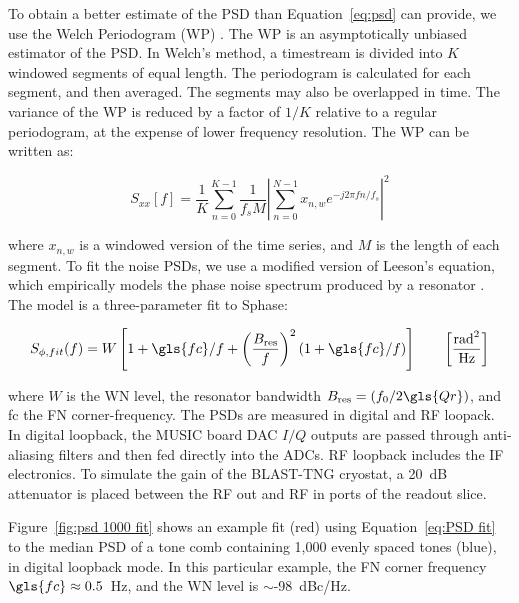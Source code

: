 To obtain a better estimate of the PSD than Equation~\ref{eq:psd} can provide, we use the Welch Periodogram (WP) \citep{welch1967use}. The WP is an asymptotically unbiased estimator of the PSD\@. In Welch's method, a timestream is divided into $K$ windowed segments of equal length. The periodogram is calculated for each segment, and then averaged. The segments may also be overlapped in time. The variance of the WP is reduced by a factor of $1/K$ relative to a regular periodogram, at the expense of lower frequency resolution. The WP can be written as:

\begin{equation}\label{eq:WP}
S_{xx}[f] = \frac{1}{K} \sum_{n=0}^{K - 1}\frac{1}{f_{s} M} \left| \sum_{n=0}^{N - 1} x_{n,w} e^{-j2\pi f n / f_{s} }\right|^{2}
\end{equation}

where $x_{n,w}$ is a windowed version of the time series, and $M$ is the length of each segment. To fit the noise PSDs, we use a modified version of Leeson's equation, which empirically models the phase noise spectrum produced by a resonator \citep{lesson1966simple}. The model is a three-parameter fit to \gls{Sphase}:

\begin{equation}\label{eq:PSD fit}
  S_{\phi,fit}(f) = W\left[ 1 + \gls{fc}/f + \left( \frac{B_{\mathrm{res}}}{f} \right)^{2} (1 + \gls{fc}/f) \right] \qquad \left[  \frac{\mathrm{rad}^{2}}{\mathrm{Hz}} \right]
\end{equation}

where $W$ is the WN level, the resonator bandwidth $B_{\mathrm{res}} = (f_{0}/2\gls{Qr})$, and \gls{fc} the FN corner-frequency. The PSDs are measured in digital and RF loopack. In digital loopback, the MUSIC board DAC $I/Q$ outputs are passed through anti-aliasing filters and then fed directly into the ADCs. RF loopback includes the IF electronics. To simulate the gain of the BLAST-TNG cryostat, a 20~dB attenuator is placed between the RF out and RF in ports of the readout slice.

Figure~\ref{fig:psd 1000 fit} shows an example fit (red) using Equation~\ref{eq:PSD fit} to the median PSD of a tone comb containing 1,000 evenly spaced tones (blue), in digital loopback mode. In this particular example, the FN corner frequency $\gls{fc} \approx 0.5$~Hz, and the WN level is $\sim$-98~dBc/Hz.

